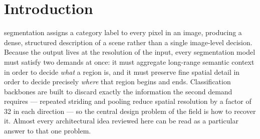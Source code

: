 \documentclass[journal]{IEEEtran}
\begin{document}
%
\IEEEpeerreviewmaketitle



\section{Introduction}
%
%
%
%
 segmentation assigns a category label to every pixel in
an image, producing a dense, structured description of a scene rather than a single
image-level decision. Because the output lives at the resolution of the input, every
segmentation model must satisfy two demands at once: it must aggregate long-range
semantic context in order to decide \emph{what} a region is, and it must preserve
fine spatial detail in order to decide precisely \emph{where} that region begins and
ends. Classification backbones are built to discard exactly the information the
second demand requires --- repeated striding and pooling reduce spatial resolution by
a factor of 32 in each direction --- so the central design problem of the field is
how to recover it. Almost every architectural idea reviewed here can be read as a
particular answer to that one problem.
\end{document}
